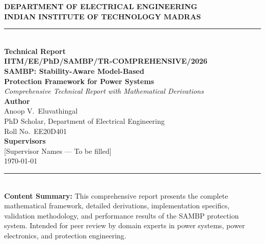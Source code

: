 \documentclass[12pt,a4paper]{article}
\begin{document}


\begin{titlepage}
  \begin{center}
    \vspace*{2cm}
    
    {\Large \textbf{DEPARTMENT OF ELECTRICAL ENGINEERING}}\\[0.4cm]
    {\Large \textbf{INDIAN INSTITUTE OF TECHNOLOGY MADRAS}}\\[0.4cm]
    \rule{\linewidth}{2pt}\\[0.8cm]

    {\LARGE \textbf{Technical Report}}\\[0.5cm]
    {\Large \textbf{IITM/EE/PhD/SAMBP/TR-COMPREHENSIVE/2026}}\\[2cm]

    {\huge \bfseries
     SAMBP: Stability-Aware Model-Based\\[0.4cm]
     Protection Framework for Power Systems}\\[0.5cm]
    
    {\large \textit{Comprehensive Technical Report with Mathematical Derivations}}\\[2cm]

    {\Large \textbf{Author}}\\[0.2cm]
    {\large Anoop V.\ Eluvathingal}\\[0.2cm]
    {\normalsize PhD Scholar, Department of Electrical Engineering}\\[0.1cm]
    {\normalsize Roll No.\ EE20D401}\\[1.5cm]

    {\large \textbf{Supervisors}}\\[0.2cm]
    {\normalsize [Supervisor Names — To be filled]}\\[1.5cm]

    {\normalsize \today}\\[1cm]
    
    \rule{\linewidth}{2pt}\\[1cm]

    {\small
    \noindent \textbf{Content Summary:} This comprehensive report presents the complete 
    mathematical framework, detailed derivations, implementation specifics, validation 
    methodology, and performance results of the SAMBP protection system. Intended for 
    peer review by domain experts in power systems, power electronics, and protection 
    engineering.}

  \end{center}
\end{titlepage}
\end{document}
